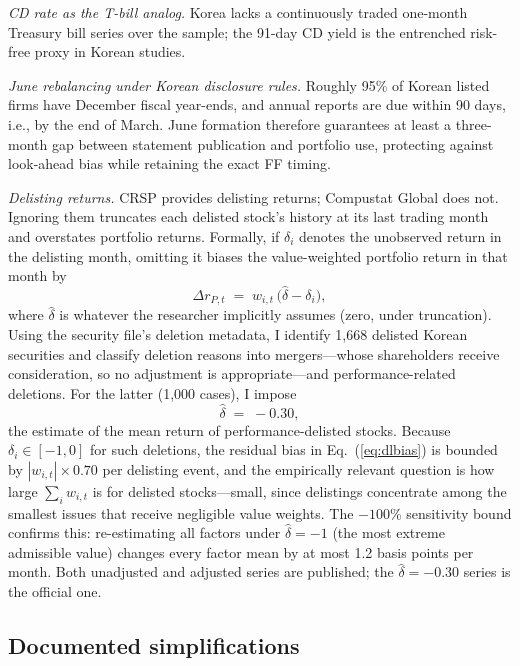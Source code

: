 \documentclass[11pt]{article}
\begin{document}
\emph{CD rate as the T-bill analog.} Korea lacks a continuously traded one-month Treasury bill series over the sample; the 91-day CD yield is the entrenched risk-free proxy in Korean studies.

\emph{June rebalancing under Korean disclosure rules.} Roughly 95\% of Korean listed firms have December fiscal year-ends, and annual reports are due within 90 days, i.e., by the end of March. June formation therefore guarantees at least a three-month gap between statement publication and portfolio use, protecting against look-ahead bias while retaining the exact FF timing.

\emph{Delisting returns.}\label{sec:delisting} CRSP provides delisting returns; Compustat Global does not. Ignoring them truncates each delisted stock's history at its last trading month and overstates portfolio returns. Formally, if $\delta_{i}$ denotes the unobserved return in the delisting month, omitting it biases the value-weighted portfolio return in that month by
\begin{equation}
\Delta r_{P,t} \;=\; w_{i,t}\,\bigl(\hat{\delta} - \delta_i\bigr),
\label{eq:dlbias}
\end{equation}
where $\hat{\delta}$ is whatever the researcher implicitly assumes (zero, under truncation). Using the security file's deletion metadata, I identify 1{,}668 delisted Korean securities and classify deletion reasons into mergers---whose shareholders receive consideration, so no adjustment is appropriate---and performance-related deletions. For the latter (1{,}000 cases), I impose
\begin{equation}
\hat{\delta} \;=\; -0.30,
\label{eq:shumway}
\end{equation}
the \citet{shumway1997} estimate of the mean return of performance-delisted stocks. Because $\delta_i \in [-1, 0]$ for such deletions, the residual bias in Eq.~(\ref{eq:dlbias}) is bounded by $|w_{i,t}| \times 0.70$ per delisting event, and the empirically relevant question is how large $\sum_i w_{i,t}$ is for delisted stocks---small, since delistings concentrate among the smallest issues that receive negligible value weights. The $-100$\% sensitivity bound confirms this: re-estimating all factors under $\hat{\delta}=-1$ (the most extreme admissible value) changes every factor mean by at most 1.2 basis points per month. Both unadjusted and adjusted series are published; the $\hat{\delta}=-0.30$ series is the official one.

\subsection{Documented simplifications}
\end{document}
